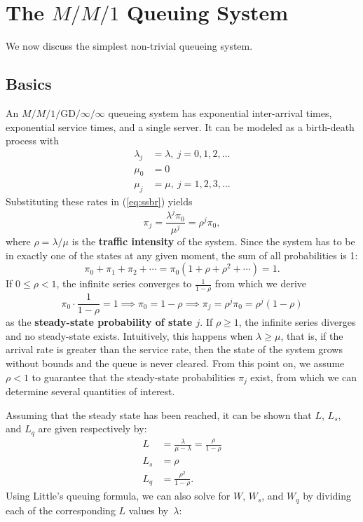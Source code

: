 \section{The $M/M/1$ Queuing System}
We now discuss the simplest non-trivial queueing system.  
\subsection{Basics} An $M/M/1/\textrm{GD}/\infty/\infty$ queueing system has exponential inter-arrival times, exponential service times, and a single server. It can be modeled as a birth-death process with
\begin{align*}
\lambda_{j} &= \lambda, \ j=0,1,2,\ldots \\ 
\mu_{0} &= 0 \\
\mu_{j} &= \mu,\  j=1,2,3,\ldots 
\end{align*}
Substituting these rates in (\ref{eq:ssbr}) yields 
$$\pi_{j} = \frac{\lambda^{j} \pi_{0}}{\mu^{j}}=\rho^j \pi_0,$$ where $\rho = \lambda/\mu$ is the \textbf{traffic intensity} of the system. \newpage\noindent 
Since the system has to be in exactly one of the states at any given moment, the sum of all probabilities is 1: $$\pi_{0}+\pi_1 + \pi_2+\cdots = \pi_0(1+\rho+\rho^{2}+\cdots ) = 1.$$
If $0 \leq \rho < 1$, the infinite series converges to $\frac{1}{1-\rho}$ from which we derive $$\pi_{0}\cdot \frac{1}{1-\rho} = 1 \implies \pi_0 = 1-\rho \implies \pi_{j} = \rho^{j} \pi_0 = \rho^j (1-\rho)$$
as the \textbf{steady-state probability of state $j$}.  If $\rho \geq 1$, the infinite series diverges and no steady-state exists. Intuitively, this happens when $\lambda \geq \mu$, that is, if the arrival rate is greater than the service rate, then the state of the system grows without bounds and the queue is never cleared.
\newl From this point on, we assume $\rho < 1$ to guarantee that the steady-state probabilities $\pi_{j}$  exist, from which we can determine several quantities of interest. \par Assuming that the steady state has been reached, it can be shown that $L$, $L_{s}$, and $L_{q}$ are given respectively by:
\begin{align*}
L &= \frac{\lambda}{\mu - \lambda}=\frac{\rho}{1-\rho}\\
L_{s} &= \rho\\
 L_{q} &= \frac{\rho^{2}}{1-\rho}.
 \end{align*}
Using Little's queuing formula, we can also solve for $W$, $W_{s}$, and $W_{q}$ by dividing each of the corresponding $L$ values by~$\lambda$:
